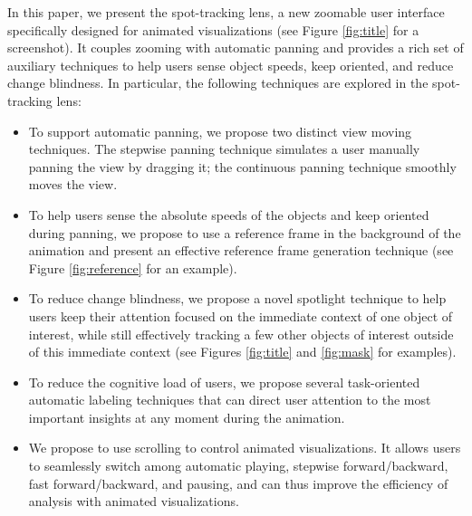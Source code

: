\documentclass[review]{vgtc}                 %
\begin{document}
In this paper, we present the spot-tracking lens, a new zoomable user interface specifically designed for animated visualizations (see Figure \ref{fig:title} for a screenshot). It couples zooming with automatic panning and provides a rich set of auxiliary techniques to help users sense object speeds, keep oriented, and reduce change blindness. In particular, the following techniques are explored in the spot-tracking lens:
\begin{itemize}
\item To support automatic panning, we propose two distinct view moving techniques. The stepwise panning technique simulates a user manually panning the view by dragging it; the continuous panning technique smoothly moves the view.
\item To help users sense the absolute speeds of the objects and keep oriented during panning, we propose to use a reference frame in the background of the animation and present an effective reference frame generation technique (see Figure \ref{fig:reference} for an example).
\item To reduce change blindness, we propose a novel spotlight technique to help users keep their attention focused on the immediate context of one object of interest, while still effectively tracking a few other objects of interest outside of this immediate context (see Figures \ref{fig:title} and \ref{fig:mask} for examples).
\item To reduce the cognitive load of users, we propose several task-oriented automatic labeling techniques that can direct user attention to the most important insights at any moment during the animation.
\item We propose to use scrolling to control animated visualizations. It allows users to seamlessly switch among automatic playing, stepwise  forward/backward, fast forward/backward, and pausing, and can thus improve the efficiency of analysis with animated visualizations.
\end{itemize}
\end{document}
